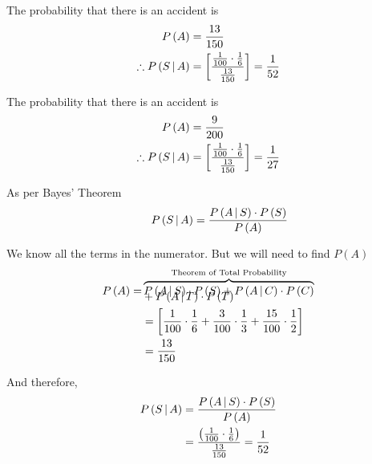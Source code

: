 \documentclass[14pt,fleqn]{extarticle}
\newcommand\prob[1]{P \left(#1 \right)}
\begin{document}
\begin{question}
\begin{step}
\end{step}

\begin{step}
  \begin{options} 
     \correct 
     
       The probability that there is an accident is 
       \begin{align}
       \prob{A} &= \frac{13}{150} \\
       \therefore \condp{S}{A} &= \left[ \dfrac{\frac{1}{100}\cdot\frac{1}{6}}{\frac{13}{150}}\right] =\frac{1}{52} 
\end{align}
     \incorrect
     
     The probability that there is an accident is 
       \begin{align}
       \prob{A} &= \frac{9}{200} \\
       \therefore \condp{S}{A} &= \left[ \dfrac{\frac{1}{100}\cdot\frac{1}{6}}{\frac{13}{150}}\right] =\frac{1}{27} 
\end{align}
        
    \end{options} 
     \reason 
       
     As per Bayes' Theorem 
     \[ \qquad P\left(S\,\vert\,A\right) = \frac{P\left(A\,\vert\,S\right)\cdot P\left(S\right)}{P\left(A\right)}  \]
     
     We know all the terms in the numerator. But we will need to find $\prob{A}$
     \begin{align}
	\prob{A} = &\overbrace{\condp{A}{S}\cdot\prob{S} + \condp{A}{C}\cdot\prob{C}}^{\text{Theorem of Total Probability}} \\[-10pt]
	&+ \condp{A}{T}\cdot\prob{T} \\
	&= \left[ \frac{1}{100}\cdot\frac{1}{6} + \frac{3}{100}\cdot\frac{1}{3} + \frac{15}{100}\cdot\frac{1}{2} \right] \\
	&= \frac{13}{150} 
\end{align}

And therefore, 
\begin{align}
P\left(S\,\vert\,A\right) &= \frac{P\left(A\,\vert\,S\right)\cdot P\left(S\right)}{P\left(A\right)} \\
&= \dfrac{ \left( \frac{1}{100}\cdot\frac{1}{6}\right)}{\frac{13}{150}} = \frac{1}{52}
\end{align}

\end{step}
          
\end{question} 
\end{document}

